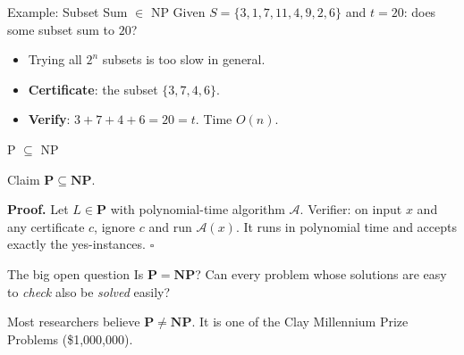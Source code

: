 \documentclass[10pt,aspectratio=169]{beamer}
\begin{document}
\begin{frame}{Example: Subset Sum $\in$ NP}
  Given $S = \{3, 1, 7, 11, 4, 9, 2, 6\}$ and $t = 20$: does some subset sum
  to $20$?

  \bigskip
  \begin{center}
  \end{center}

  \bigskip
  \begin{itemize}
    \item Trying all $2^n$ subsets is too slow in general.
    \item<2-> \textbf{Certificate}: the subset $\{3, 7, 4, 6\}$.
    \item<2-> \textbf{Verify}: $3 + 7 + 4 + 6 = 20 = t$. Time $O(n)$.
  \end{itemize}
\end{frame}

\begin{frame}{P $\subseteq$ NP}
  \begin{block}{Claim}
    $\mathbf{P} \subseteq \mathbf{NP}$.
  \end{block}

  \textbf{Proof.} Let $L \in \mathbf{P}$ with polynomial-time algorithm
  $\mathcal{A}$. Verifier: on input $x$ and any certificate $c$, ignore $c$
  and run $\mathcal{A}(x)$. It runs in polynomial time and accepts exactly
  the yes-instances. \hfill $\square$

  \pause
  \bigskip
  \begin{block}{The big open question}
    Is $\mathbf{P} = \mathbf{NP}$? Can every problem whose solutions are
    easy to \emph{check} also be \emph{solved} easily?
  \end{block}

  \medskip
  Most researchers believe $\mathbf{P} \ne \mathbf{NP}$. It is one of the
  Clay Millennium Prize Problems (\$1{,}000{,}000).
\end{frame}
\end{document}
